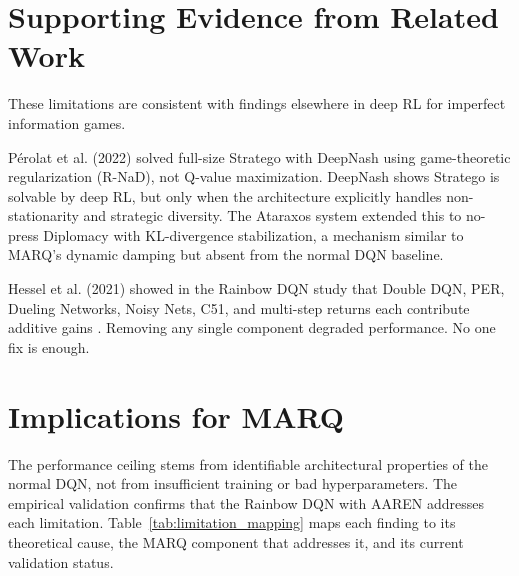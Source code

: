 \section{Supporting Evidence from Related Work}

These limitations are consistent with findings elsewhere in deep RL for imperfect information games.

P\'{e}rolat et al. (2022) solved full-size Stratego with DeepNash \cite{perolat2022stratego} using game-theoretic regularization (R-NaD), not Q-value maximization. DeepNash shows Stratego is solvable by deep RL, but only when the architecture explicitly handles non-stationarity and strategic diversity. The Ataraxos system \cite{Ataraxos2025} extended this to no-press Diplomacy with KL-divergence stabilization, a mechanism similar to MARQ's dynamic damping but absent from the normal DQN baseline.

Hessel et al. (2021) showed in the Rainbow DQN study that Double DQN, PER, Dueling Networks, Noisy Nets, C51, and multi-step returns each contribute additive gains \cite{RainbowJMLR2021}. Removing any single component degraded performance. No one fix is enough.


\section{Implications for MARQ}

The performance ceiling stems from identifiable architectural properties of the normal DQN, not from insufficient training or bad hyperparameters. The empirical validation confirms that the Rainbow DQN with AAREN addresses each limitation. Table~\ref{tab:limitation_mapping} maps each finding to its theoretical cause, the MARQ component that addresses it, and its current validation status.

